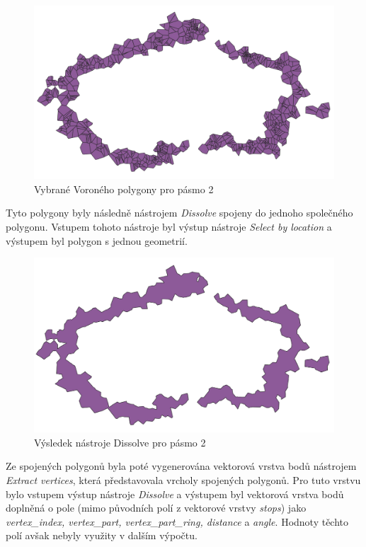 \begin{figure}[H] \centering
    \includegraphics[width=400pt]{./pictures/voronoi-selected.png}
    \caption[Vybrané Voroného polygony pro pásmo 2]{Vybrané Voroného polygony pro pásmo 2}
	\label{fig:voronoi-selected}              
\end{figure}

Tyto polygony byly následně nástrojem \textit{Dissolve} spojeny do jednoho společného polygonu.
Vstupem tohoto nástroje byl výstup nástroje \textit{Select by location} a výstupem byl polygon
s jednou geometrií. 

\begin{figure}[H] \centering
    \includegraphics[width=400pt]{./pictures/dissolve.png}
    \caption[Výsledek nástroje Dissolve pro pásmo 2]{Výsledek nástroje Dissolve pro pásmo 2}
	\label{fig:dissolve}              
\end{figure} 

Ze spojených polygonů byla poté vygenerována vektorová vrstva bodů nástrojem
\textit{Extract vertices}, která představovala vrcholy spojených polygonů. Pro tuto vrstvu
bylo vstupem výstup nástroje \textit{Dissolve} a výstupem byl vektorová vrstva bodů 
doplněná o pole (mimo původních polí z vektorové vrstvy \textit{stops}) jako \textit{vertex\_index,
vertex\_part, vertex\_part\_ring, distance} a \textit{angle}.
Hodnoty těchto polí avšak nebyly využity v dalším výpočtu.

